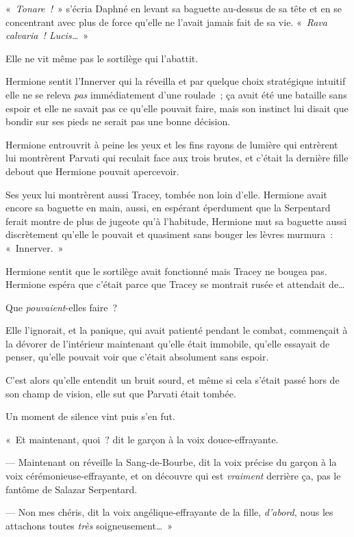 «~\emph{Tonare~!}~» s'écria Daphné en levant sa baguette au-dessus de sa tête et en se concentrant avec plus de force qu'elle ne l'avait jamais fait de sa vie. «~\emph{Rava calvaria~! Lucis…}~»

Elle ne vit même pas le sortilège qui l'abattit.

\later

Hermione sentit l'Innerver qui la réveilla et par quelque choix stratégique intuitif elle ne se releva \emph{pas} immédiatement d'une roulade~; ça avait été une bataille sans espoir et elle ne savait pas ce qu'elle pouvait faire, mais son instinct lui disait que bondir sur ses pieds ne serait pas une bonne décision.

Hermione entrouvrit à peine les yeux et les fins rayons de lumière qui entrèrent lui montrèrent Parvati qui reculait face aux trois brutes, et c'était la dernière fille debout que Hermione pouvait apercevoir.

Ses yeux lui montrèrent aussi Tracey, tombée non loin d'elle. Hermione avait encore sa baguette en main, aussi, en espérant éperdument que la Serpentard ferait montre de plus de jugeote qu'à l'habitude, Hermione mut sa baguette aussi discrètement qu'elle le pouvait et quasiment sans bouger les lèvres murmura~: «~Innerver.~»

Hermione sentit que le sortilège avait fonctionné mais Tracey ne bougea pas. Hermione espéra que c'était parce que Tracey se montrait rusée et attendait de…

Que \emph{pouvaient}-elles faire~?

Elle l'ignorait, et la panique, qui avait patienté pendant le combat, commençait à la dévorer de l'intérieur maintenant qu'elle était immobile, qu'elle essayait de penser, qu'elle pouvait voir que c'était absolument sans espoir.

C'est alors qu'elle entendit un bruit sourd, et même si cela s'était passé hors de son champ de vision, elle sut que Parvati était tombée.

Un moment de silence vint puis s'en fut.

«~Et maintenant, quoi~? dit le garçon à la voix douce-effrayante.

--- Maintenant on réveille la Sang-de-Bourbe, dit la voix précise du garçon à la voix cérémonieuse-effrayante, et on découvre qui est \emph{vraiment} derrière ça, pas le fantôme de Salazar Serpentard.

--- Non mes chéris, dit la voix angélique-effrayante de la fille, \emph{d'abord}, nous les attachons toutes \emph{très} soigneusement…~»


